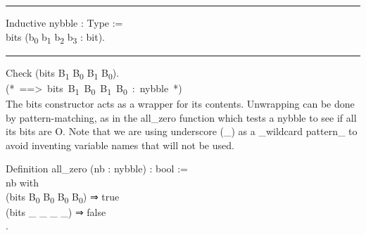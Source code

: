 \documentclass[utf8]{ctexart}
\begin{document}
\begin{center}\rule{0.5\linewidth}{\linethickness}\end{center}

{Inductive} {nybble} : {Type} :=\\
\hspace*{0.333em}\hspace*{0.333em}\textbar{} {bits}
({b\textsubscript{0}} {b\textsubscript{1}} {b\textsubscript{2}}
{b\textsubscript{3}} : {bit}).\\

\begin{center}\rule{0.5\linewidth}{\linethickness}\end{center}

{Check} ({bits} {B\textsubscript{1}} {B\textsubscript{0}}
{B\textsubscript{1}} {B\textsubscript{0}}).\\
{(*~==\textgreater~bits~B\textsubscript{1}~B\textsubscript{0}~B\textsubscript{1}~B\textsubscript{0}~:~nybble~*)}\\

The {{bits}} constructor acts as a wrapper for its contents. Unwrapping
can be done by pattern-matching, as in the {{all\_zero}} function which
tests a nybble to see if all its bits are O. Note that we are using
underscore (\_) as a \_wildcard pattern\_ to avoid inventing variable
names that will not be used.

{Definition} {all\_zero} ({nb} : {nybble}) : {bool} :=\\
\hspace*{0.333em}\hspace*{0.333em}{match} {nb} {with}\\
\hspace*{0.333em}\hspace*{0.333em}\hspace*{0.333em}\hspace*{0.333em}\textbar{}
({bits} {B\textsubscript{0}} {B\textsubscript{0}} {B\textsubscript{0}}
{B\textsubscript{0}}) ⇒ {true}\\
\hspace*{0.333em}\hspace*{0.333em}\hspace*{0.333em}\hspace*{0.333em}\textbar{}
({bits} {\_} {\_} {\_} {\_}) ⇒ {false}\\
\hspace*{0.333em}\hspace*{0.333em}{end}.\\
\end{document}
